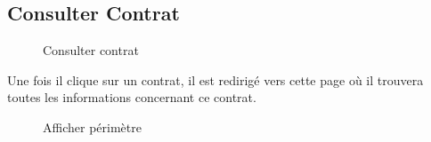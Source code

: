 \documentclass[a4paper]{report}
\begin{document}
\begin{doublespace}
	\subsection{Consulter Contrat}
	\begin{figure}[H]
		\begin{center}
			\caption{Consulter contrat}
		\end{center}
	\end{figure}
	Une fois il clique sur un contrat, il est redirigé vers cette page où il trouvera toutes les informations concernant ce contrat.
	\begin{figure}[H]
		\begin{center}
			\caption{Afficher périmètre}
		\end{center}
	\end{figure}

\end{doublespace}
\end{document}
